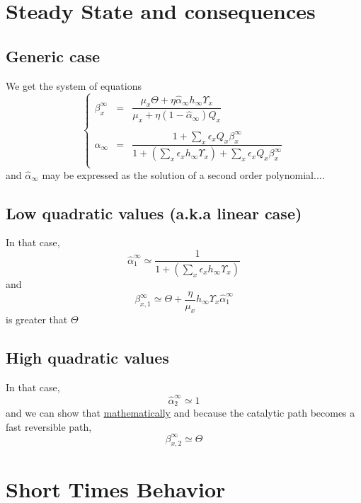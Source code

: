 \documentclass[aps,onecolumn,12pt]{revtex4}
\begin{document}
\section{Steady State and consequences}
\subsection{Generic case}
We get the system of equations
\begin{equation}
\left\lbrace
\begin{array}{rcl}
	\beta_x^\infty & = & \dfrac{\mu_x\Theta + \eta \hat\alpha_\infty h_\infty \Upsilon_x}{\mu_x + \eta (1-\hat\alpha_\infty) Q_x}\\
	\\
	\hat\alpha_\infty & = & \dfrac{1+\sum_x\epsilon_x Q_x\beta_x^\infty}{1 + \left(\sum_x \epsilon_x h_\infty \Upsilon_x \right) + \sum_x\epsilon_x Q_x\beta_x^\infty}\\
\end{array}
\right.
\end{equation}
and $\hat\alpha_\infty$ may be expressed as the solution of a second order polynomial....

\subsection{Low quadratic values (a.k.a linear case)}
In that case,
\begin{equation}
		\hat\alpha_1^\infty \simeq \dfrac{1}{1+\left(\sum_x \epsilon_x h_\infty \Upsilon_x \right)}
\end{equation}
and 
\begin{equation}
	\beta_{x,1}^\infty \simeq \Theta + \dfrac{\eta}{\mu_x}  h_\infty \Upsilon_x \hat\alpha_1^\infty
\end{equation}
is greater that $\Theta$
\subsection{High quadratic values}
In that case,
\begin{equation}
	\hat\alpha_2^\infty \simeq 1
\end{equation}
and we can show that \underline{mathematically} and because the catalytic path becomes a fast reversible path,
\begin{equation}
	\beta_{x,2}^\infty \simeq \Theta 
\end{equation}

\section{Short Times Behavior}
\end{document}
